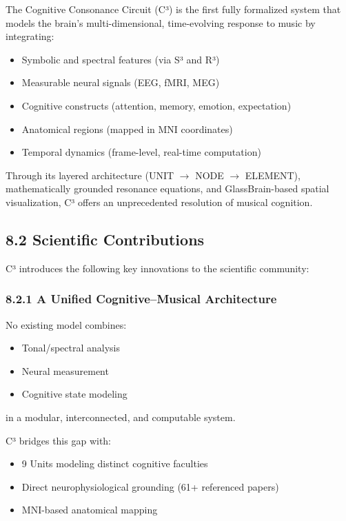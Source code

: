 \documentclass[10pt]{article}
\begin{document}
The Cognitive Consonance Circuit (C³) is the first fully formalized system that models the brain’s multi-dimensional, time-evolving response to music by integrating:

\begin{itemize}
    \item Symbolic and spectral features (via S³ and R³)
    \item Measurable neural signals (EEG, fMRI, MEG)
    \item Cognitive constructs (attention, memory, emotion, expectation)
    \item Anatomical regions (mapped in MNI coordinates)
    \item Temporal dynamics (frame-level, real-time computation)
\end{itemize}

Through its layered architecture (UNIT $\rightarrow$ NODE $\rightarrow$ ELEMENT), mathematically grounded resonance equations, and GlassBrain-based spatial visualization, C³ offers an unprecedented resolution of musical cognition.

\subsection*{8.2 Scientific Contributions}

C³ introduces the following key innovations to the scientific community:

\subsubsection*{8.2.1 A Unified Cognitive–Musical Architecture}

No existing model combines:

\begin{itemize}
    \item Tonal/spectral analysis
    \item Neural measurement
    \item Cognitive state modeling
\end{itemize}

in a modular, interconnected, and computable system.

C³ bridges this gap with:

\begin{itemize}
    \item 9 Units modeling distinct cognitive faculties
    \item Direct neurophysiological grounding (61+ referenced papers)
    \item MNI-based anatomical mapping
\end{itemize}
\end{document}
